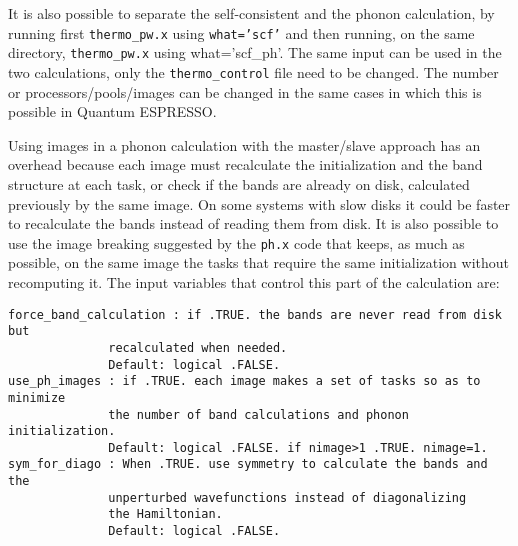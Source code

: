 \documentclass[12pt,a4paper]{article}
\begin{document}
It is also possible to separate the self-consistent and the phonon calculation,
by running first \texttt{thermo\_pw.x} using \texttt{what='scf'} and then
running, on the same directory, \texttt{thermo\_pw.x} using 
{what='scf\_ph'}. The same input can be used in the two calculations, only
the \texttt{thermo\_control} file need to be changed.
The number or processors/pools/images can be changed in the same cases in
which this is possible in Quantum ESPRESSO.

Using images in a phonon calculation with the master/slave approach
has an overhead because each image must recalculate the initialization
and the band structure at each task, or check if the bands are 
already on disk, calculated previously by the same image. On some systems 
with slow disks it could be faster to recalculate the bands instead of 
reading them from disk. It is also possible to use the image breaking
suggested by the \texttt{ph.x} code that keeps, as much as possible, 
on the same image the tasks that require the same initialization without
recomputing it.
The input variables that control this part of the calculation are:
\begin{verbatim}
force_band_calculation : if .TRUE. the bands are never read from disk but
              recalculated when needed.
              Default: logical .FALSE.
use_ph_images : if .TRUE. each image makes a set of tasks so as to minimize
              the number of band calculations and phonon initialization.
              Default: logical .FALSE. if nimage>1 .TRUE. nimage=1.
sym_for_diago : When .TRUE. use symmetry to calculate the bands and the 
              unperturbed wavefunctions instead of diagonalizing 
              the Hamiltonian.
              Default: logical .FALSE.
\end{verbatim}
\end{document}
